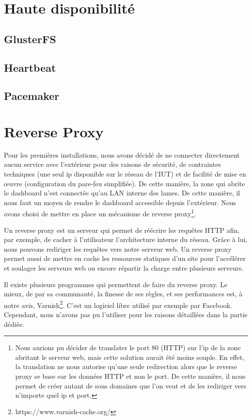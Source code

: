 \documentclass[a4paper,oneside]{report}
\begin{document}
\section{Haute disponibilité}
\subsection{GlusterFS}

\subsection{Heartbeat}

\subsection{Pacemaker}

\section{Reverse Proxy}
Pour les premières installations, nous avons décidé de ne connecter directement aucun service avec l'extérieur pour des raisons de sécurité, de contraintes techniques (une seul ip disponible sur le réseau de l'IUT) et de facilité de mise en œuvre (configuration du pare-feu simplifiée).
De cette manière, la zone qui abrite le dashboard n'est connectée qu'au LAN interne des lames.
De cette manière, il nous faut un moyen de rendre le dashboard accessible depuis l'extérieur. 
Nous avons choisi de mettre en place un mécanisme de reverse proxy\footnote{Nous aurions pu décider de translater le port 80 (HTTP) sur l'ip de la zone abritant le serveur web, mais cette solution aurait été moins souple.
En effet, la translation ne nous autorise qu'une seule redirection alors que le reverse proxy se base sur les données HTTP et non le port. De cette manière, il nous permet de créer autant de sous domaines que l'on veut et de les rediriger vers n'importe quel ip et port.}.

Un reverse proxy est un serveur qui permet de réécrire les requêtes HTTP afin, par exemple, de cacher à l'utilisateur l'architecture interne du réseau.
Grâce à lui, nous pouvons rediriger les requêtes vers notre serveur web.
Un reverse proxy permet aussi de mettre en cache les ressources statiques d'un site pour l'accélérer et soulager les serveurs web ou encore répartir la charge entre plusieurs serveurs.

Il existe plusieurs programmes qui permettent de faire du reverse proxy.
Le mieux, de par sa communauté, la finesse de ses règles, et ses performances est, à notre avis, Varnish\footnote{https://www.varnish-cache.org/}.
C'est un logiciel libre utilisé par exemple par Facebook. Cependant, nous n'avons pas pu l'utiliser pour les raisons détaillées dans la partie dédiée.
\end{document}
